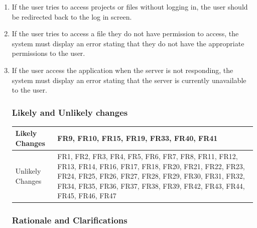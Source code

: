 \documentclass[12pt, titlepage]{article}
\begin{document}
	\begin{enumerate}[{UE}1.]
		\item If the user tries to access projects or files without logging in, the user should be redirected back to the log in screen.
		\item If the user tries to access a file they do not have permission to access, the system must display an error stating that they do not have the appropriate permissions to the user.
		\item If the user access the application when the server is not responding, the system must display an error stating that the server is currently unavailable to the user.
		
		\subsubsection{Likely and Unlikely changes}
		
		\begin{tabular}{|l | p{85mm} |}
			\hline
			Likely Changes & FR9, FR10, FR15, FR19, FR33, FR40, FR41  \\
			\hline
			Unlikely Changes & FR1, FR2, FR3, FR4, FR5, FR6, FR7, FR8, FR11, FR12, FR13, FR14, FR16, FR17, FR18, FR20, FR21, FR22, FR23, FR24, FR25, FR26, FR27, FR28, FR29, FR30, FR31, FR32, FR34, FR35, FR36, FR37, FR38, FR39, FR42, FR43, FR44, FR45, FR46, FR47 \\
			\hline
		\end{tabular}
		
		\subsubsection{Rationale and Clarifications}
		

\end{enumerate}
\end{document}
